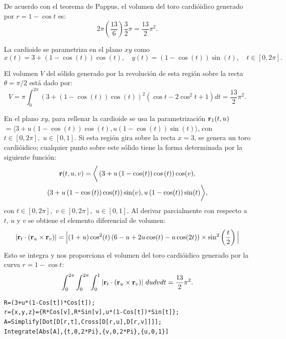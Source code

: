 De acuerdo con el teorema de Pappus, el volumen del toro cardióidico generado por
$r=1-\cos t$ es:
\[2\pi \left( \frac{13}{6}\right) \frac{3}{2}\pi =\frac{13}{2}\pi ^{2}.\]

La cardioide se parametriza en el plano $xy$ como
\[x(t)=3+\left( 1-\cos (t) \right) \cos (t),\quad y(t)=\left( 1-\cos (t) \right) \sin (t),\quad t\in[0,2\pi].\]

El volumen $V$ del sólido generado por la revolución de esta región sobre la recta $\theta = \pi/2$ está dado por:
\[V=\pi \int_{0}^{2\pi }\left( 3+\left( 1-\cos (t) \right) \cos (t) \right) ^{2}(\cos t-2\cos ^{2}t+1)dt =
\frac{13}{2}\pi ^{2}.\]

En el plano $xy$, para rellenar la cardioide se usa la parametrización
${\bf r}_1(t,u)$ $=\langle 3+u(1-\cos (t)) \cos (t),u(1-\cos (t)) \sin (t) \rangle $, con $t\in [0,2\pi ],\,\, u\in [0,1]$. Si esta región gira sobre la recta $x=3$, se genera un toro cardióidico; cualquier punto sobre este sólido tiene la forma determinada por la siguiente función:
\begin{multline*}
{\bf r}(t,u,v)=\bigg \langle \left( 3+u\left( 1-\cos (t) \right) \cos \left(
t\right) \right) \cos (v) , \\
\left( 3+u\left( 1-\cos \left(t\right) \right) \cos (t) \right) \sin (v) , u\left(1-\cos (t) \right) \sin (t) \bigg \rangle,
\end{multline*}
con $t\in [0,2\pi ],\,\,v\in [0,2\pi ],\,\, u\in [0,1]$.
Al derivar parcialmente con respecto a $t$, $u$ y $v$ se obtiene el elemento diferencial de volumen:
\begin{gather*}
\left|{\bf r}_{t}\cdot \left( {\bf r}_{u}\times {\bf r}_{v}\right)\right|
= \Big|(1+u)\cos^2(t)\left(6 - u + 2u\cos(t) - u\cos(2t)\right)
\times \sin^2\left( \frac{t}{2} \right)\Big|
\end{gather*}
Esto se integra y nos proporciona el volumen del toro cardióidico generado por la curva $r = 1 - \cos t$:
\[
\int_{0}^{2\pi }\int_{0}^{2\pi }\int_{0}^{1}
\left|{\bf r}_{t}\cdot \left( {\bf r}_{u}\times {\bf r}_{v}\right)\right| \, dudvdt
= \frac{13}{2}\pi ^{2}.
\]


\begin{tcolorbox}[title=\bf Instrucción \verb"Mathematica"]\begin{Verbatim}[formatcom=\letraverbatim]
R=(3+u*(1-Cos[t])*Cos[t]);
r={x,y,z}={R*Cos[v],R*Sin[v],u*(1-Cos[t])*Sin[t]};
A=Simplify[Dot[D[r,t],Cross[D[r,u],D[r,v]]]];
Integrate[Abs[A],{t,0,2*Pi},{v,0,2*Pi},{u,0,1}]
\end{Verbatim}
\end{tcolorbox}

